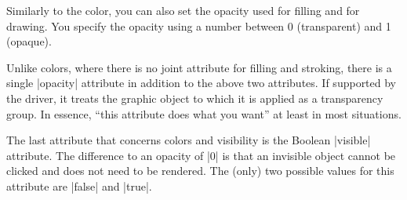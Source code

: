 \begin{codeexample}[]
\end{codeexample}

Similarly to the color, you can also set the opacity used for filling
and for drawing. You specify the opacity using a number between 0
(transparent) and 1 (opaque). 

\begin{codeexample}[width=2.3cm]
\end{codeexample}

\begin{codeexample}[width=2.3cm]
\end{codeexample}

Unlike colors, where there is no joint attribute for filling and
stroking, there is a single |opacity| attribute in addition to the above
two attributes. If supported by the driver, it treats the graphic
object to which it is applied as a transparency group. In essence,
``this attribute does what you want'' at least in most situations.

\begin{codeexample}[width=2.3cm]
\end{codeexample}

The last attribute that concerns colors and visibility is the
Boolean |visible| attribute. The difference to an opacity of |0| is
that an invisible object cannot be clicked and does not need to be
rendered. The (only) two possible values for this attribute are
|false| and |true|.

\begin{codeexample}[width=2.3cm]
\end{codeexample}


